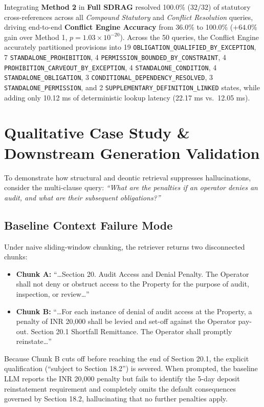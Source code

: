 \documentclass[conference]{IEEEtran}
\begin{document}
Integrating \textbf{Method 2} in \textbf{Full SDRAG} resolved 100.0\% ($32/32$) of statutory cross-references across all \textit{Compound Statutory} and \textit{Conflict Resolution} queries, driving end-to-end \textbf{Conflict Engine Accuracy} from 36.0\% to 100.0\% ($+64.0\%$ gain over Method 1, $p = 1.03 \times 10^{-20}$). Across the 50 queries, the Conflict Engine accurately partitioned provisions into 19 \texttt{OBLIGATION\_QUALIFIED\_BY\_EXCEPTION}, 7 \texttt{STANDALONE\_PROHIBITION}, 4 \texttt{PERMISSION\_BOUNDED\_BY\_CONSTRAINT}, 4 \texttt{PROHIBITION\_CARVEOUT\_BY\_EXCEPTION}, 4 \texttt{STANDALONE\_CONDITION}, 4 \texttt{STANDALONE\_OBLIGATION}, 3 \texttt{CONDITIONAL\_DEPENDENCY\_RESOLVED}, 3 \texttt{STANDALONE\_PERMISSION}, and 2 \texttt{SUPPLEMENTARY\_DEFINITION\_LINKED} states, while adding only 10.12 ms of deterministic lookup latency (22.17 ms vs.\ 12.05 ms).

\section{Qualitative Case Study \& Downstream Generation Validation}

To demonstrate how structural and deontic retrieval suppresses hallucinations, consider the multi-clause query: \textit{``What are the penalties if an operator denies an audit, and what are their subsequent obligations?''}

\subsection{Baseline Context Failure Mode}
Under naive sliding-window chunking, the retriever returns two disconnected chunks:
\begin{itemize}
    \item \textbf{Chunk A:} ``\dots Section 20. Audit Access and Denial Penalty. The Operator shall not deny or obstruct access to the Property for the purpose of audit, inspection, or review\dots''
    \item \textbf{Chunk B:} ``\dots For each instance of denial of audit access at the Property, a penalty of INR 20,000 shall be levied and set-off against the Operator pay-out. Section 20.1 Shortfall Remittance. The Operator shall promptly reinstate\dots''
\end{itemize}
Because Chunk B cuts off before reaching the end of Section 20.1, the explicit qualification (``subject to Section 18.2'') is severed. When prompted, the baseline LLM reports the INR 20,000 penalty but fails to identify the 5-day deposit reinstatement requirement and completely omits the default consequences governed by Section 18.2, hallucinating that no further penalties apply.
\end{document}
